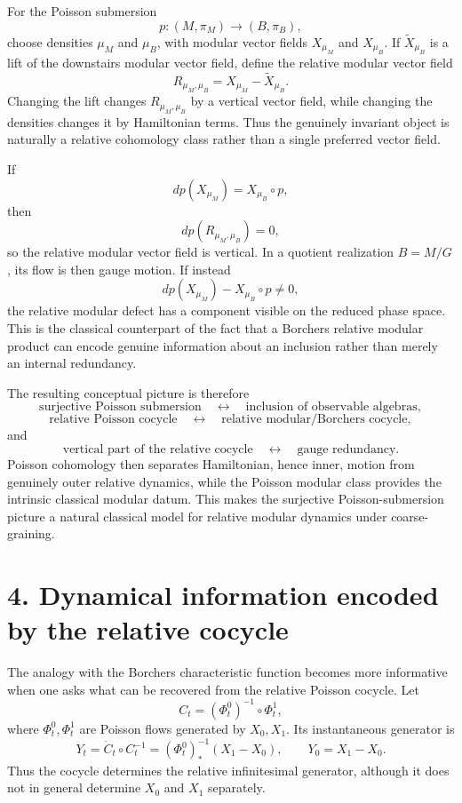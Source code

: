 \documentclass[11pt]{article}
\begin{document}
For the Poisson submersion
\[
p:(M,\pi_M)\to(B,\pi_B),
\]
choose densities $\mu_M$ and $\mu_B$, with modular vector fields
$X_{\mu_M}$ and $X_{\mu_B}$.  If $\widetilde X_{\mu_B}$ is a lift of the
downstairs modular vector field, define the relative modular vector field
\[
R_{\mu_M,\mu_B}
=
X_{\mu_M}-\widetilde X_{\mu_B}.
\]
Changing the lift changes $R_{\mu_M,\mu_B}$ by a vertical vector field, while
changing the densities changes it by Hamiltonian terms.  Thus the genuinely
invariant object is naturally a relative cohomology class rather than a single
preferred vector field.

If
\[
dp(X_{\mu_M})
=
X_{\mu_B}\circ p,
\]
then
\[
dp(R_{\mu_M,\mu_B})=0,
\]
so the relative modular vector field is vertical.  In a quotient realization
$B=M/G$, its flow is then gauge motion.  If instead
\[
dp(X_{\mu_M})
-
X_{\mu_B}\circ p
\neq0,
\]
the relative modular defect has a component visible on the reduced phase
space.  This is the classical counterpart of the fact that a Borchers relative
modular product can encode genuine information about an inclusion rather than
merely an internal redundancy.

The resulting conceptual picture is therefore
\[
\boxed{\text{surjective Poisson submersion}}
\quad\longleftrightarrow\quad
\boxed{\text{inclusion of observable algebras}},
\]
\[
\boxed{\text{relative Poisson cocycle}}
\quad\longleftrightarrow\quad
\boxed{\text{relative modular/Borchers cocycle}},
\]
and
\[
\boxed{\text{vertical part of the relative cocycle}}
\quad\longleftrightarrow\quad
\boxed{\text{gauge redundancy}}.
\]
Poisson cohomology then separates Hamiltonian, hence inner, motion from genuinely
outer relative dynamics, while the Poisson modular class provides the intrinsic
classical modular datum.  This makes the surjective Poisson-submersion picture
a natural classical model for relative modular dynamics under coarse-graining.


\section*{4. Dynamical information encoded by the relative cocycle}

The analogy with the Borchers characteristic function becomes more informative
when one asks what can be recovered from the relative Poisson cocycle.  Let
\[
C_t=(\Phi_t^0)^{-1}\circ\Phi_t^1,
\]
where $\Phi_t^0,\Phi_t^1$ are Poisson flows generated by $X_0,X_1$.  Its
instantaneous generator is
\[
Y_t=\dot C_t\circ C_t^{-1}
=(\Phi_t^0)^{-1}_*(X_1-X_0),
\qquad
Y_0=X_1-X_0.
\]
Thus the cocycle determines the relative infinitesimal generator, although it
does not in general determine $X_0$ and $X_1$ separately.
\end{document}
